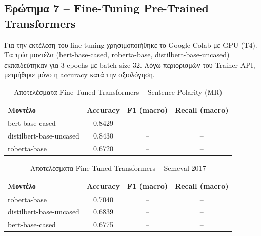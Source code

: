 \documentclass[11pt,a4paper]{article}
\begin{document}

\subsection*{Ερώτημα 7 -- \textlatin{Fine-Tuning Pre-Trained Transformers}}


Για την εκτέλεση του fine-tuning χρησιμοποιήθηκε το \textlatin{Google Colab} με \textlatin{GPU (T4)}.
Τα τρία μοντέλα (\textlatin{bert-base-cased}, \textlatin{roberta-base}, \textlatin{distilbert-base-uncased})
εκπαιδεύτηκαν για 3 \textlatin{epochs} με \textlatin{batch size} 32. Λόγω περιορισμών του \textlatin{Trainer API},
μετρήθηκε μόνο η \textlatin{accuracy} κατά την αξιολόγηση.

\begin{table}[H]
  \centering
  \caption{Αποτελέσματα \textlatin{Fine-Tuned Transformers} -- \textlatin{Sentence Polarity (MR)}}
  \begin{tabular}{lccc}
    \toprule
    \textbf{Μοντέλο} & \textbf{\textlatin{Accuracy}} & \textbf{\textlatin{F1 (macro)}} & \textbf{\textlatin{Recall (macro)}} \\
    \midrule
    \textlatin{bert-base-cased}           & 0.8429 & -- & -- \\
    \textlatin{distilbert-base-uncased}   & 0.8430 & -- & -- \\
    \textlatin{roberta-base}              & 0.6720 & -- & -- \\
    \bottomrule
  \end{tabular}
\end{table}

\begin{table}[H]
  \centering
  \caption{Αποτελέσματα \textlatin{Fine-Tuned Transformers} -- \textlatin{Semeval 2017}}
  \begin{tabular}{lccc}
    \toprule
    \textbf{Μοντέλο} & \textbf{\textlatin{Accuracy}} & \textbf{\textlatin{F1 (macro)}} & \textbf{\textlatin{Recall (macro)}} \\
    \midrule
    \textlatin{roberta-base}              & 0.7040 & -- & -- \\
    \textlatin{distilbert-base-uncased}   & 0.6839 & -- & -- \\
    \textlatin{bert-base-cased}           & 0.6775 & -- & -- \\
    \bottomrule
  \end{tabular}
\end{table}
\end{document}
